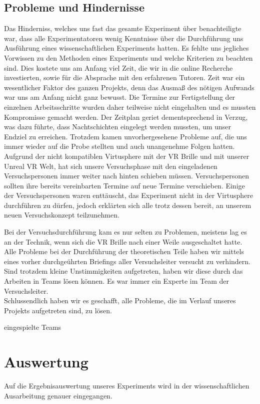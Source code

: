 \documentclass{Bericht}
\begin{document}
\subsection{Probleme und Hindernisse}
Das Hinderniss, welches uns fast das gesamte Experiment über benachteiligte war, dass alle Experimentatoren wenig Kenntnisse über die Durchführung uns Ausführung eines wissenschaftlichen Experiments hatten. Es fehlte uns jegliches Vorwissen zu den Methoden eines Experiments und welche Kriterien zu beachten sind. Dies kostete uns am Anfang viel Zeit, die wir in die online Recherche investierten, sowie für die Absprache mit den erfahrenen Tutoren. Zeit war ein wesentlicher Faktor des ganzen Projekts, denn das Ausmaß des nötigen Aufwands war uns am Anfang nicht ganz bewusst. Die Termine zur Fertigstellung der einzelnen Arbeitsschritte wurden daher teilweise nicht eingehalten und es mussten Kompromisse gemacht werden. Der Zeitplan geriet dementsprechend in Verzug, was dazu führte, dass Nachtschichten eingelegt werden mussten, um unser Endziel zu erreichen. Trotzdem kamen unvorhergesehene Probleme auf, die uns immer wieder auf die Probe stellten und auch unangenehme Folgen hatten. Aufgrund der nicht kompatiblen Virtusphere mit der VR Brille und mit unserer Unreal VR Welt, hat sich unsere Versuchsphase mit den eingeladenen Versuchspersonen immer weiter nach hinten schieben müssen. Versuchspersonen sollten ihre bereits vereinbarten Termine auf neue Termine verschieben. Einige der Versuchspersonen waren enttäuscht, das Experiment nicht in der Virtusphere durchführen zu dürfen, jedoch erklärten sich alle trotz dessen bereit, an unserem neuen Versuchskonzept teilzunehmen.

Bei der Versuchsdurchführung kam es nur selten zu Problemen, meistens lag es an der Technik, wenn sich die VR Brille nach einer Weile ausgeschaltet hatte. Alle Probleme bei der Durchführung der theoretischen Teile haben wir mittels eines vorher durchgeührten Briefings aller Versuchsleiter versucht zu verhindern. Sind trotzdem kleine Unstimmigkeiten aufgetreten, haben wir diese durch das Arbeiten in Teams lösen können. Es war immer ein Experte im Team der Versuchsleiter. \\
Schlussendlich haben wir es geschafft, alle Probleme, die im Verlauf unseres Projekts aufgetreten sind, zu lösen.

eingespielte Teams

\newpage
\section{Auswertung} %
	Auf die Ergebnisauswertung unseres Experiments wird in der wissenschaftlichen Ausarbeitung genauer eingegangen.
\end{document}
